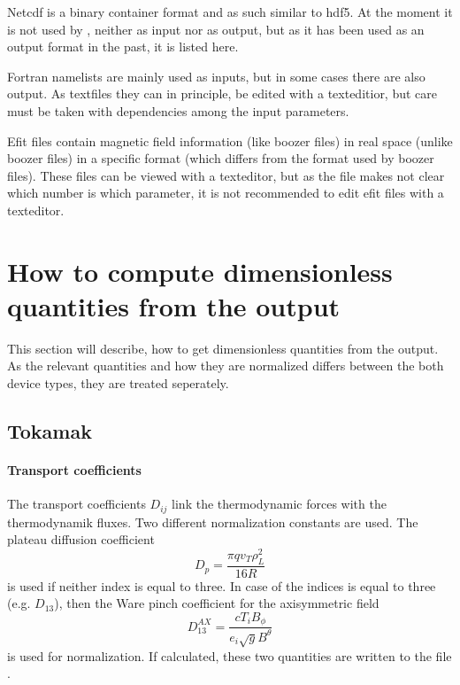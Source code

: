 Netcdf is a binary container format and as such similar to hdf5. At the
moment it is not used by \neotwo, neither as input nor as output, but as
it has been used as an output format in the past, it is listed here.

Fortran namelists are mainly used as inputs, but in some cases there are
also output. As textfiles they can in principle, be edited with a
texteditior, but care must be taken with dependencies among the input
parameters.

Efit files contain magnetic field information (like boozer files) in
real space (unlike boozer files) in a specific format (which differs
from the format used by boozer files). These files can be viewed with
a texteditor, but as the file makes not clear which number is which
parameter, it is not recommended to edit efit files with a texteditor.

\section{How to compute dimensionless quantities from the output}
This section will describe, how to get dimensionless quantities from the
\neotwo output. As the relevant quantities and how they are normalized
differs between the both device types, they are treated seperately.

\subsection{Tokamak}

\paragraph{Transport coefficients}
The transport coefficients $D_{ij}$ link the thermodynamic forces with
the thermodynamik fluxes. Two different normalization constants are
used.
The plateau diffusion coefficient
\begin{equation}
  D_p = \frac{\pi q v_T \rho_L^2}{16 R}
\end{equation}
is used if neither index is equal to three. In case of the indices is
equal to three (e.g. $D_{13}$), then the Ware pinch coefficient  for the
axisymmetric field
\begin{equation}
  D_{13}^{AX} = \frac{cT_i B_{\phi}}{e_i \sqrt{g} B^{\theta}}
\end{equation}
is used for normalization.
If calculated, these two quantities are written to the file
.

